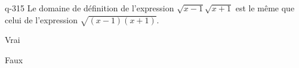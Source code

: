 \begin{truefalse}{q-315}
Le domaine de définition de l'expression $\sqrt{x-1}\sqrt{x+1}$ est le même que celui de l'expression $\sqrt{(x-1)(x+1)}$.
\item Vrai
\item* Faux
\end{truefalse}

